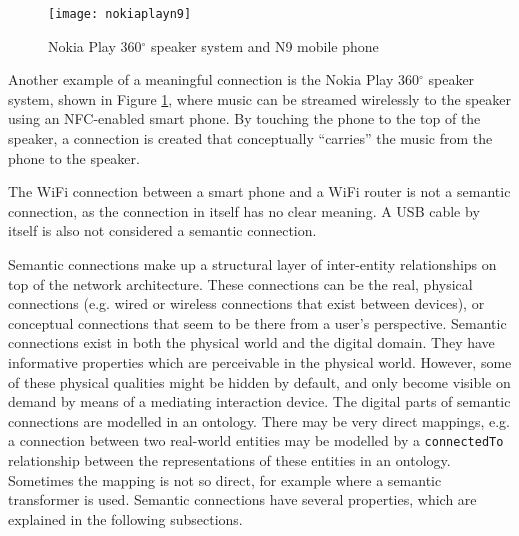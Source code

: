 \begin{figure}
\begin{center}
\texttt{[image: nokiaplayn9]}
\end{center}
\caption{Nokia Play 360$^{\circ}$ speaker system and N9 mobile phone}
\label{nokiaplay}
\end{figure}


Another example of a meaningful connection is the Nokia Play 360$^{\circ}$ speaker system, shown in Figure \ref{nokiaplay}, where music can be streamed wirelessly to the speaker using an \ac{NFC}-enabled smart phone. By touching the phone to the top of the speaker, a connection is created that conceptually ``carries'' the music from the phone to the speaker.

The WiFi connection between a smart phone and a WiFi router is not a semantic connection, as the connection in itself has no clear meaning. A USB cable by itself is also not considered a semantic connection.

Semantic connections make up a structural layer of inter-entity relationships on top of the network architecture. These connections can be the real, physical connections (e.g. wired or wireless connections that exist between devices), or conceptual connections that seem to be there from a user's perspective. 
Semantic connections exist in both the physical world and the digital domain. They have informative properties which are perceivable in the physical world. However, some of these physical qualities might be hidden by default, and only become visible on demand by means of a mediating interaction device. The digital parts of semantic connections are modelled in an ontology. There may be very direct mappings, e.g. a connection between two real-world entities may be modelled by a \texttt{connectedTo} relationship between the representations of these entities in an ontology. Sometimes the mapping is not so direct, for example where a semantic transformer is used. Semantic connections have several properties, which are explained in the following subsections. 


